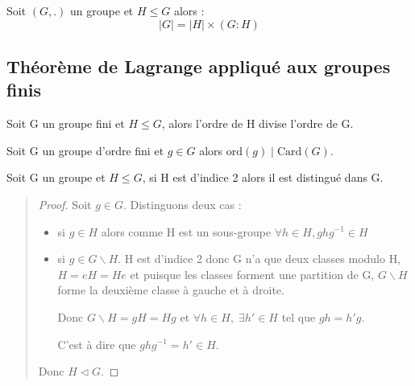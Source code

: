 \begin{theorem}
    Soit $(G,.)$ un groupe et $H \leq G$ alors : 
        \[ |G| = |H| \times (G:H) \]
\end{theorem}

\subsection{Théorème de Lagrange appliqué aux groupes finis}

\begin{theorem}
    Soit G un groupe fini et $H \leq G$, alors {l'ordre de H divise l'ordre de G}.
\end{theorem}

\begin{corollary}
    Soit G un groupe d'ordre fini et $g \in G$ alors $ \text{ord}(g) \mid  \text{Card}(G)$. 
\end{corollary}

\begin{proposition}
    Soit G un groupe et $H \leq G$, si H est d'indice 2 alors il est distingué dans G. 
\end{proposition}

\begin{quote}
	\footnotesize
	\begin{proof}
        Soit $g \in G$. Distinguons deux cas :
        \begin{itemize}
            \item si $g \in H$ alors comme H est un sous-groupe $ \forall h \in H, ghg^{-1} \in H$ 
            \item si $g \in G \backslash H$. H est d'indice 2 donc G n'a que deux classes modulo H, 
            $H = eH = He$ et puisque les classes forment une partition de G, $G \backslash H$ forme la deuxième classe 
            à gauche et à droite. 

            Donc $G \backslash H = gH = Hg$ et $ \forall h \in H, \; \exists h' \in H$ tel que $gh = h'g$. 

            C'est à dire que $ghg^{-1} = h' \in H$. 
        \end{itemize}
        Donc $H \triangleleft G$. 
    \end{proof}
	\normalsize
\end{quote}